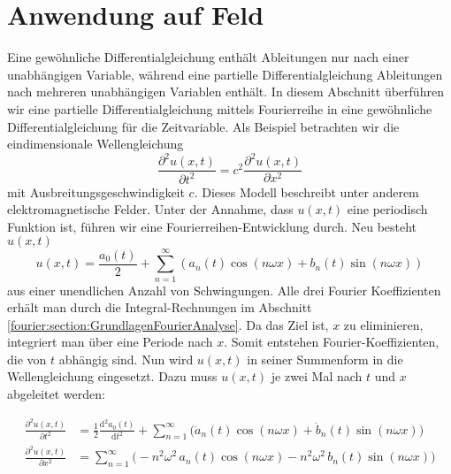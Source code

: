 %
%
%
%



\section{Anwendung auf Feld\label{fourier:section:AnwendungAufFeld}}

Eine gewöhnliche Differentialgleichung enthält Ableitungen nur nach einer unabhängigen Variable, während eine partielle Differentialgleichung Ableitungen nach mehreren unabhängigen Variablen enthält.  
In diesem Abschnitt überführen wir eine partielle Differentialgleichung mittels Fourierreihe in eine gewöhnliche Differentialgleichung für die Zeitvariable.
Als Beispiel betrachten wir die eindimensionale Wellengleichung  
\begin{equation}\label{eq:wellengleichung}
	\frac{\partial^2 u(x,t)}{\partial t^2} = c^2 \frac{\partial^2 u(x,t)}{\partial x^2}
\end{equation}  
mit Ausbreitungsgeschwindigkeit $c$. Dieses Modell beschreibt unter anderem elektromagnetische Felder.  
Unter der Annahme, dass $u(x, t)$ eine periodisch Funktion ist, führen wir eine Fourierreihen-Entwicklung durch. 
Neu besteht $u(x, t)$ 
\begin{equation}
	u(x,t) = \frac{a_0(t)}{2} + \sum_{n=1}^{\infty} \left( a_n(t) \cos(n \omega x) + b_n(t) \sin(n \omega x) \right)
\end{equation}
aus einer unendlichen Anzahl von Schwingungen.
Alle drei Fourier Koeffizienten erhält man durch die Integral-Rechnungen im Abschnitt \ref{fourier:section:GrundlagenFourierAnalyse}. 
Da das Ziel ist, $x$ zu eliminieren, integriert man über eine Periode nach $x$.
Somit entstehen Fourier-Koeffizienten, die von $t$ abhängig sind. 
Nun wird $u(x,t)$ in seiner Summenform in die Wellengleichung eingesetzt. 
Dazu muss $u(x,t)$ je zwei Mal nach $t$ und $x$ abgeleitet werden:

\begin{equation}
	\begin{aligned}
		\frac{\partial^2 u(x,t)}{\partial t^2}
		&= \frac{1}{2}\frac{\mathrm d^2 a_0(t)}{\mathrm d t^2}
		+ \sum_{n=1}^{\infty}\bigl(\ddot a_n(t)\cos(n\omega x)+\ddot b_n(t)\sin(n\omega x)\bigr)\\
		\frac{\partial^2 u(x,t)}{\partial x^2}
		&= \sum_{n=1}^{\infty}\bigl(-n^2\omega^2\,a_n(t)\cos(n\omega x)-n^2\omega^2\,b_n(t)\sin(n\omega x)\bigr)
	\end{aligned}
\end{equation}

